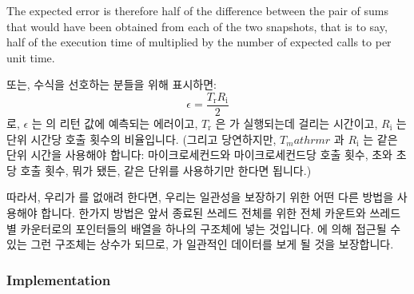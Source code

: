 {	The expected error is therefore half of the difference between
	the pair of sums that would have been obtained from each of the
	two snapshots, that is to say, half of the execution time of
	 multiplied by the number of expected calls to
	 per unit time.
	\fi

	또는, 수식을 선호하는 분들을 위해 표시하면:
	\begin{equation}
	\epsilon = \frac{T_\mathrm{r} R_\mathrm{i}}{2}
	\end{equation}
	로, $\epsilon$ 는  의 리턴 값에 예측되는 에러이고,
	$T_\mathrm{r}$ 은  가 실행되는데 걸리는 시간이고,
	$R_\mathrm{i}$ 는 단위 시간당  호출 횟수의 비율입니다.
	(그리고 당연하지만, $T_mathrm{r}$ 과 $R_\mathrm{i}$ 는 같은 단위 시간을
	사용해야 합니다:
	마이크로세컨드와 마이크로세컨드당 호출 횟수, 초와 초당 호출 횟수, 뭐가
	됐든, 같은 단위를 사용하기만 한다면 됩니다.)
	\iffalse

	Or, for those who prefer equations:
	\begin{equation}
	\epsilon = \frac{T_\mathrm{r} R_\mathrm{i}}{2}
	\end{equation}
	where $\epsilon$ is the expected error in \co{read_count()}'s
	return value,
	$T_\mathrm{r}$ is the time that \co{read_count()} takes to execute,
	and $R_\mathrm{i}$ is the rate of \co{inc_count()} calls per unit time.
	(And of course, $T_\mathrm{r}$ and $R_\mathrm{i}$ should use the same units of
	time: microseconds and calls per microsecond, seconds and calls
	per second, or whatever, as long as they are the same units.)
	\fi
} \QuickQuizEnd

따라서, 우리가  를 없애려 한다면, 우리는 일관성을 보장하기 위한
어떤 다른 방법을 사용해야 합니다.
한가지 방법은 앞서 종료된 쓰레드 전체를 위한 전체 카운트와 쓰레드별 카운터로의
포인터들의 배열을 하나의 구조체에 넣는 것입니다.
 에 의해 접근될 수 있는 그런 구조체는 상수가 되므로,
 가 일관적인 데이터를 보게 될 것을 보장합니다.
\iffalse

Therefore, if we are to dispense with \co{final_mutex}, we will need
to come up with some other method for ensuring consistency.
One approach is to place the total count for all previously exited
threads and the array of pointers to the per-thread counters into a single
structure.
Such a structure, once made available to \co{read_count()}, is
held constant, ensuring that \co{read_count()} sees consistent data.
\fi

\subsubsection{Implementation}

